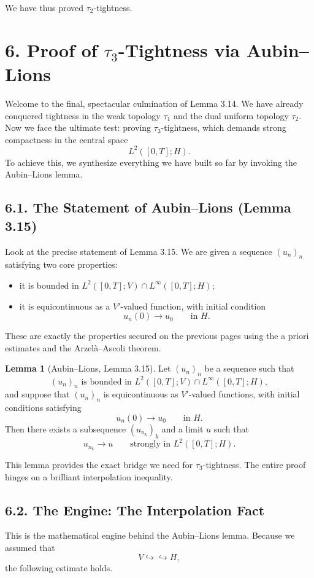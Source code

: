 \documentclass[11pt]{article}
\theoremstyle{definition}
\newtheorem{lemma}{Lemma}
\theoremstyle{remark}
\begin{document}
We have thus proved $\tau_2$-tightness.

\section*{6. Proof of $\tau_3$-Tightness via Aubin--Lions}
Welcome to the final, spectacular culmination of Lemma 3.14. We have already conquered tightness in the weak topology $\tau_1$ and the dual uniform topology $\tau_2$. Now we face the ultimate test: proving $\tau_3$-tightness, which demands strong compactness in the central space
\[
  L^2([0,T];H).
\]
To achieve this, we synthesize everything we have built so far by invoking the Aubin--Lions lemma.

\subsection*{6.1. The Statement of Aubin--Lions (Lemma 3.15)}
Look at the precise statement of Lemma 3.15. We are given a sequence $(u_n)_n$ satisfying two core properties:
\begin{itemize}
\item it is bounded in $L^2([0,T];V)\cap L^\infty([0,T];H)$;
\item it is equicontinuous as a $V'$-valued function, with initial condition
\[
  u_n(0)\to u_0 \qquad \text{in } H.
\]
\end{itemize}
These are exactly the properties secured on the previous pages using the a priori estimates and the Arzel\`a--Ascoli theorem.

\begin{lemma}[Aubin--Lions, Lemma 3.15]
Let $(u_n)_n$ be a sequence such that
\[
  (u_n)_n \text{ is bounded in } L^2([0,T];V)\cap L^\infty([0,T];H),
\]
and suppose that $(u_n)_n$ is equicontinuous as $V'$-valued functions, with initial conditions satisfying
\[
  u_n(0)\to u_0 \qquad \text{in } H.
\]
Then there exists a subsequence $(u_{n_k})_k$ and a limit $u$ such that
\[
  u_{n_k}\to u
  \qquad \text{strongly in } L^2([0,T];H).
\]
\end{lemma}

This lemma provides the exact bridge we need for $\tau_3$-tightness. The entire proof hinges on a brilliant interpolation inequality.

\subsection*{6.2. The Engine: The Interpolation Fact}
This is the mathematical engine behind the Aubin--Lions lemma. Because we assumed that
\[
  V\hookrightarrow\hookrightarrow H,
\]
the following estimate holds.
\end{document}
